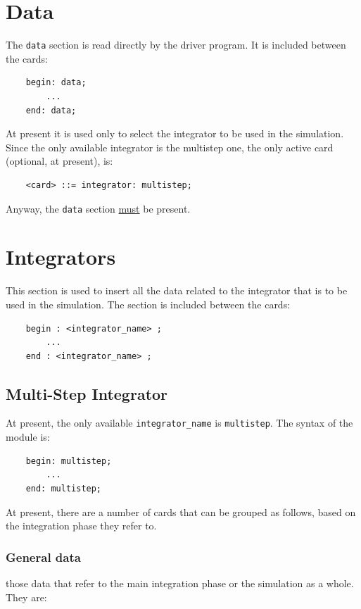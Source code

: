 \documentclass[10pt,dvips]{report}
\begin{document}
  





\chapter{Data}
The {\tt data} section is read directly by the driver program. It is
included between the cards:
\begin{verbatim}
    begin: data;
        ...
    end: data;
\end{verbatim}
At present it is used only to select the integrator to be used in the
simulation. 
Since the only available integrator is the multistep one, the only active 
card (optional, at present), is:
\begin{verbatim}
    <card> ::= integrator: multistep;
\end{verbatim}
Anyway, the {\tt data} section \underline{must} be present.





\chapter{Integrators}
This section is used to insert all the data related to the integrator that
is to be used in the simulation. The section is included between the cards:
\begin{verbatim}
    begin : <integrator_name> ;
        ...
    end : <integrator_name> ;
\end{verbatim}





\section{Multi-Step Integrator}
At present, the only available {\tt integrator\_name} is {\tt multistep}.
The syntax of the module is:
\begin{verbatim}
    begin: multistep;
        ...
    end: multistep;
\end{verbatim}
At present, there are a number of cards that can be grouped as follows, 
based on the integration phase they refer to.

\subsection{General data}
those data that refer to the main integration phase or the simulation as a
whole. They are:
\end{document}
